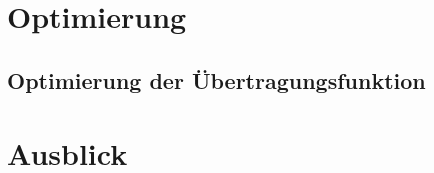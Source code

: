 \documentclass[colorbacktitle,inverttitle,landscape,presentation,
	english,
	aspectratio=43, %
	accentcolor=tud9b, %
]{tudbeamer}
\begin{document}
\section{Optimierung}
\subsection{Optimierung der Übertragungsfunktion}
%
%
%
%

\section{Ausblick}
%


%
%
%

	
	
\end{document}
